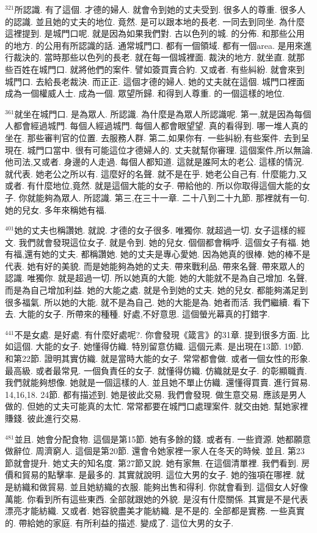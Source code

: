 \documentclass{book}
\begin{document}
$^{321}$所認識.
有了這個.
才德的婦人.
就會令到她的丈夫受到.
很多人的尊重.
很多人的認識.
並且她的丈夫的地位.
竟然.
是可以跟本地的長老.
一同去到同坐.
為什麼這裡提到.
是城門口呢.
就是因為如果我們對.
古以色列的城.
的分佈.
和那些公用的地方.
的公用有所認識的話.
通常城門口.
都有一個領域.
都有一個area.
是用來進行裁決的.
當時那些以色列的長老.
就在每一個城裡面.
裁決的地方.
就坐直.
就那些百姓在城門口.
就將他們的案件.
譬如簽買賣合約.
又或者.
有些糾紛.
就會來到城門口.
去給長老裁決.
而正正.
這個才德的婦人.
她的丈夫就在這個.
城門口裡面成為一個權威人士.
成為一個.
眾望所歸.
和得到人尊重.
的一個這樣的地位.

$^{361}$就坐在城門口.
是為眾人.
所認識.
為什麼是為眾人所認識呢.
第一,就是因為每個人都會經過城門.
每個人經過城門.
每個人都會眼望望.
真的看得到.
哪一堆人真的坐在.
那些審判官的位置.
去服務人群.
第二,如果你有.
一些糾紛,有些案件.
去到呈現在.
城門口當中.
很有可能這位才德婦人的.
丈夫就幫你審理.
這個案件,所以無論.
他司法,又或者.
身邊的人走過.
每個人都知道.
這就是誰阿太的老公.
這樣的情況.
就代表.
她老公之所以有.
這麼好的名聲.
就不是在乎.
她老公自己有.
什麼能力,又或者.
有什麼地位,竟然.
就是這個大能的女子.
帶給他的.
所以你取得這個大能的女子.
你就能夠為眾人.
所認識.
第三,在三十一章.
二十八到二十九節.
那裡就有一句.
她的兒女.
多年來稱她有福.

$^{401}$她的丈夫也稱讚她.
就說.
才德的女子很多.
唯獨你.
就超過一切.
女子這樣的經文.
我們就會發現這位女子.
就是令到.
她的兒女.
個個都會稱呼.
這個女子有福.
她有福,還有她的丈夫.
都稱讚她.
她的丈夫是專心愛她.
因為她真的很棒.
她的棒不是代表.
她有好的美貌.
而是她能夠為她的丈夫.
帶來戰利品.
帶來名聲.
帶來眾人的認識.
唯獨你.
就是超過一切.
所以她真的大能.
她的大能就不是為自己增加.
名聲,而是為自己增加利益.
她的大能之處.
就是令到她的丈夫.
她的兒女.
都能夠滿足到很多福氣.
所以她的大能.
就不是為自己.
她的大能是為.
她者而活.
我們繼續.
看下去.
大能的女子.
所帶來的種種.
好處,不好意思.
這個螢光幕真的打錯字.

$^{441}$不是女處.
是好處.
有什麼好處呢?.
你會發現《箴言》的31章.
提到很多方面.
比如這個.
大能的女子.
她懂得仿織.
特別留意仿織.
這個元素.
是出現在13節.
19節.
和第22節.
證明其實仿織.
就是當時大能的女子.
常常都會做.
或者一個女性的形象.
最高級.
或者最常見.
一個負責任的女子.
就懂得仿織.
仿織就是女子.
的彰顯職責.
我們就能夠想像.
她就是一個這樣的人.
並且她不單止仿織.
還懂得買賣.
進行貿易.
14,16,18.
24節.
都有描述到.
她是彼此交易.
我們會發現.
做生意交易.
應該是男人做的.
但她的丈夫可能真的太忙.
常常都要在城門口處理案件.
就交由她.
幫她家裡賺錢.
彼此進行交易.

$^{481}$並且.
她會分配食物.
這個是第15節.
她有多餘的錢.
或者有.
一些資源.
她都願意做辭位.
周濟窮人.
這個是第20節.
還會令她家裡一家人在冬天的時候.
並且.
第23節就會提升.
她丈夫的知名度.
第27節又說.
她有家無.
在這個清單裡.
我們看到.
房價和貿易的點擊率.
是最多的.
其實就說明.
這位大男的女子.
她的強項在哪裡.
就是紡織和做貿易.
並且她紡織的衣服.
能夠出售和得利.
你就會看到.
這個女人好像萬能.
你看到所有這些東西.
全部就跟她的外貌.
是沒有什麼關係.
其實是不是代表漂亮才能紡織.
又或者.
她容貌盡美才能紡織.
是不是的.
全部都是實務.
一些真實的.
帶給她的家庭.
有所利益的描述.
變成了.
這位大男的女子.
\end{document}
